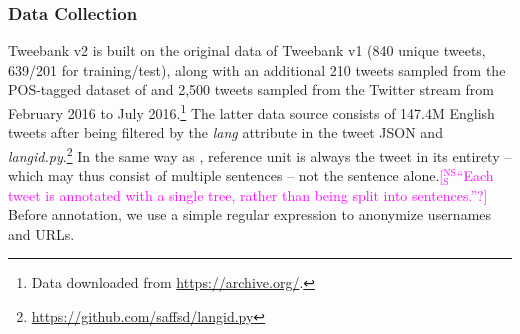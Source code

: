 \documentclass[11pt,a4paper]{article}
\newcommand{\nss}[1]{\textcolor{magenta}{[$_\mathrm{S}^\mathrm{NS}$#1]}}
\begin{document}
\subsubsection{Data Collection}
{\sc Tweebank v2} is built on the original data of {\sc Tweebank v1}
(840 unique tweets, 639/201 for training/test), along with an 
additional 210 tweets sampled from the POS-tagged dataset of
 and 2,500 tweets sampled
from the Twitter stream from February 2016 to July 2016.\footnote{Data downloaded from \url{https://archive.org/}.}
The latter data source consists of 147.4M English tweets after being
filtered by the {\it lang} attribute in the tweet JSON and {\it
  langid.py}.\footnote{\url{https://github.com/saffsd/langid.py}}
In the same way as \citet{kong-EtAl:2014:EMNLP2014},
reference unit is always the tweet in its entirety
-- which may thus consist of multiple sentences -- not the sentence alone.\nss{``Each tweet is annotated with a single tree, rather than being split into sentences.''?}
Before annotation, we use a simple regular expression to anonymize usernames and URLs.

\end{document}
